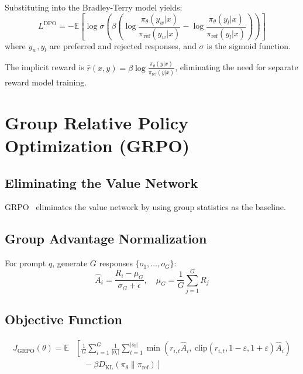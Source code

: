 \documentclass[10pt,twocolumn]{article}
\begin{document}
Substituting into the Bradley-Terry model yields:
\begin{equation}
\boxed{L^{\text{DPO}} = -\mathbb{E}\!\left[\log\sigma\!\left(\beta\!\left(\log\frac{\pi_\theta(y_w|x)}{\pi_{\text{ref}}(y_w|x)} - \log\frac{\pi_\theta(y_l|x)}{\pi_{\text{ref}}(y_l|x)}\right)\right)\right]}
\label{eq:dpo}
\end{equation}
where $y_w, y_l$ are preferred and rejected responses, and $\sigma$ is the sigmoid function.

The implicit reward is $\hat{r}(x,y) = \beta\log\frac{\pi_\theta(y|x)}{\pi_{\text{ref}}(y|x)}$, eliminating the need for separate reward model training.

\section{Group Relative Policy Optimization (GRPO)}
\label{sec:grpo}

\subsection{Eliminating the Value Network}

GRPO~\cite{deepseek2025r1, shao2024deepseekmath} eliminates the value network by using group statistics as the baseline.

\subsection{Group Advantage Normalization}

For prompt $q$, generate $G$ responses $\{o_1, \ldots, o_G\}$:
\begin{equation}
\hat{A}_i = \frac{R_i - \mu_G}{\sigma_G + \epsilon}, \quad \mu_G = \frac{1}{G}\sum_{j=1}^{G}R_j
\label{eq:grpo_adv}
\end{equation}

\subsection{Objective Function}

\begin{equation}
\boxed{
\begin{aligned}
J_{\text{GRPO}}(\theta) = \mathbb{E}&\left[\frac{1}{G}\sum_{i=1}^{G}\frac{1}{|o_i|}\sum_{t=1}^{|o_i|}\min\left(r_{i,t}\hat{A}_i,\ \text{clip}(r_{i,t}, 1{-}\varepsilon, 1{+}\varepsilon)\hat{A}_i\right)\right. \\
&\left.\quad - \beta D_{\text{KL}}(\pi_\theta \| \pi_{\text{ref}})\right]
\end{aligned}
}
\label{eq:grpo}
\end{equation}
\end{document}
